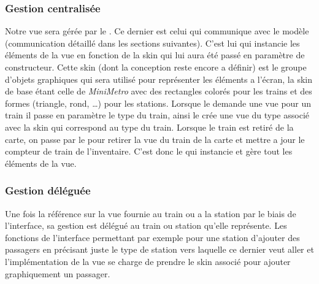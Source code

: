 \documentclass[report, backcover, french, nodocumentinfo]{upmethodology-document}
\begin{document}
			\subsubsection{Gestion centralisée}
				Notre vue sera gérée par le . Ce dernier est celui qui communique avec le modèle (communication détaillé dans les sections suivantes). C'est lui qui instancie les éléments de la vue en fonction de la skin qui lui aura été passé en paramètre de constructeur. Cette skin (dont la conception reste encore a définir) est le groupe d'objets graphiques qui sera utilisé pour représenter les éléments a l'écran, la skin de base étant celle de \textit{MiniMetro} avec des rectangles colorés pour les trains et des formes (triangle, rond, \ldots) pour les stations. Lorsque le  demande une vue pour un train il passe en paramètre le type du train, ainsi le  crée une vue du type associé avec la skin qui correspond au type du train. Lorsque le train est retiré de la carte, on passe par le  pour retirer la vue du train de la carte et mettre a jour le compteur de train de l'inventaire. C'est donc le  qui instancie et gère tout les éléments de la vue.
			\subsubsection{Gestion déléguée}
				Une fois la référence sur la vue fournie au train ou a la station par le biais de l'interface, sa gestion est délégué au train ou station qu'elle représente. Les fonctions de l'interface permettant par exemple pour une station d'ajouter des passagers en précisant juste le type de station vers laquelle ce dernier veut aller et l'implémentation de la vue se charge de prendre le skin associé pour ajouter graphiquement un passager.
\end{document}
